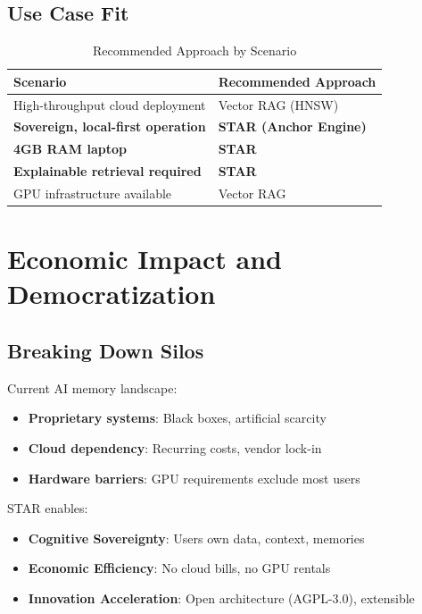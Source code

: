 \documentclass[11pt]{article}
\begin{document}
\subsection{Use Case Fit}

\begin{table}[h]
\centering
\caption{Recommended Approach by Scenario}
\label{tab:use_cases}
\begin{tabular}{@{}ll@{}}
\toprule
\textbf{Scenario} & \textbf{Recommended Approach} \\ \midrule
High-throughput cloud deployment & Vector RAG (HNSW) \\
\textbf{Sovereign, local-first operation} & \textbf{STAR (Anchor Engine)} \\
\textbf{4GB RAM laptop} & \textbf{STAR} \\
\textbf{Explainable retrieval required} & \textbf{STAR} \\
GPU infrastructure available & Vector RAG \\ \bottomrule
\end{tabular}
\end{table}

\section{Economic Impact and Democratization}
\label{sec:economic}

\subsection{Breaking Down Silos}

Current AI memory landscape:
\begin{itemize}
    \item \textbf{Proprietary systems}: Black boxes, artificial scarcity
    \item \textbf{Cloud dependency}: Recurring costs, vendor lock-in
    \item \textbf{Hardware barriers}: GPU requirements exclude most users
\end{itemize}

STAR enables:
\begin{itemize}
    \item \textbf{Cognitive Sovereignty}: Users own data, context, memories
    \item \textbf{Economic Efficiency}: No cloud bills, no GPU rentals
    \item \textbf{Innovation Acceleration}: Open architecture (AGPL-3.0), extensible
\end{itemize}
\end{document}
